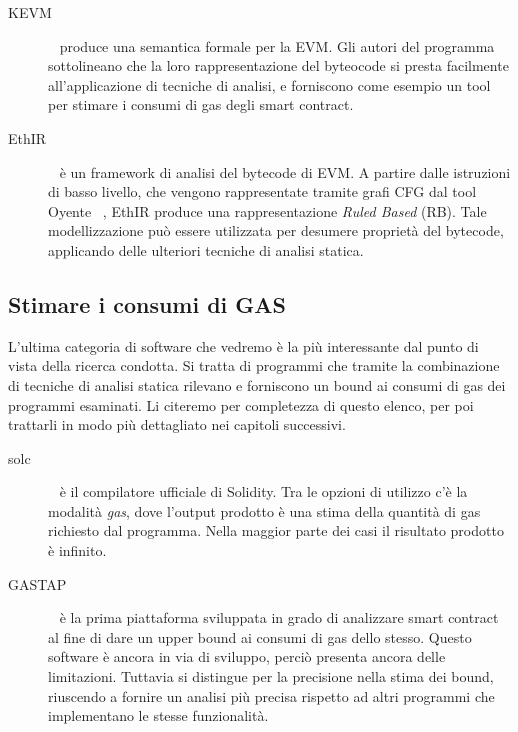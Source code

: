 \begin{description}

    \item[KEVM] ~\cite{hildenbrandt2017kevm} produce una semantica formale per la EVM. Gli autori del programma sottolineano che la loro rappresentazione del byteocode si presta facilmente all'applicazione di tecniche di analisi, e forniscono come esempio un tool per stimare i consumi di gas degli smart contract.\newline

    \item[EthIR] ~\cite{albert2018ethir} è un framework di analisi del bytecode di EVM. A partire dalle istruzioni di basso livello, che vengono rappresentate tramite grafi CFG dal tool Oyente ~\cite{}, EthIR produce una rappresentazione \textit{Ruled Based} (RB). Tale modellizzazione può essere utilizzata per desumere proprietà del bytecode, applicando delle ulteriori tecniche di analisi statica.\newline
    
\end{description}

\subsection{Stimare i consumi di GAS}

L'ultima categoria di software che vedremo è la più interessante dal punto di vista della ricerca condotta. Si tratta di programmi che tramite la combinazione di tecniche di analisi statica rilevano e forniscono un bound ai consumi di gas dei programmi esaminati.\newline
\indent Li citeremo per completezza di questo elenco, per poi trattarli in modo più dettagliato nei capitoli successivi.\newline

\begin{description}

    \item[solc] ~\cite{solidity-docs} è il compilatore ufficiale di Solidity. Tra le opzioni di utilizzo c'è la modalità \textit{gas}, dove l'output prodotto è una stima della quantità di gas richiesto dal programma. Nella maggior parte dei casi il risultato prodotto è infinito.\newline

    \item[GASTAP] ~\cite{DBLP:journals/corr/abs-1811-10403} è la prima piattaforma sviluppata in grado di analizzare smart contract al fine di dare un upper bound ai consumi di gas dello stesso. Questo software è ancora in via di sviluppo, perciò presenta ancora delle limitazioni. Tuttavia si distingue per la precisione nella stima dei bound, riuscendo a fornire un analisi più precisa rispetto ad altri programmi che implementano le stesse funzionalità. 

\end{description}
